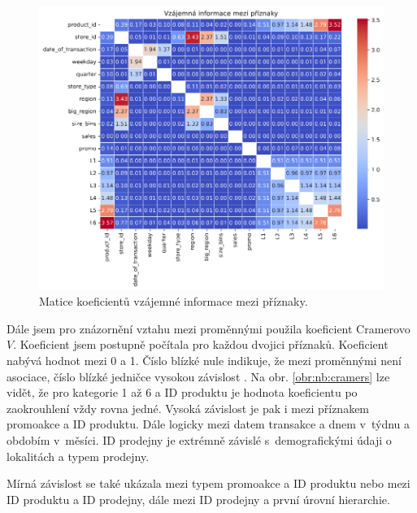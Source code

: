 \begin{figure}[h!]
    \centering
    \includegraphics[width=\textwidth]{obrazky/pripravadat/matrix_MI-everything-SFF-storesFETURES-002.png}
    \caption{Matice koeficientů vzájemné informace mezi příznaky.}
    \label{obr:nb:MI}
\end{figure}

Dále jsem pro znázornění vztahu mezi proměnnými použila koeficient Cramerovo $V$. Koeficient jsem postupně počítala pro každou dvojici příznaků. Koeficient nabývá hodnot mezi 0 a 1. Číslo blízké nule indikuje, že mezi proměnnými není asociace, číslo blízké jedničce vysokou závislost \cite{bib:statology}. Na obr. \ref*{obr:nb:cramers} lze vidět, že pro kategorie 1 až 6 a ID produktu je hodnota koeficientu po zaokrouhlení vždy rovna jedné. Vysoká závislost je pak i mezi příznakem promoakce a ID produktu. Dále logicky mezi datem transakce a dnem v~týdnu a obdobím v~měsíci. ID prodejny je extrémně závislé s~demografickými údaji o lokalitách a typem prodejny.

Mírná závislost se také ukázala mezi typem promoakce a ID produktu nebo mezi ID produktu a ID prodejny, dále mezi ID prodejny a první úrovní hierarchie.

